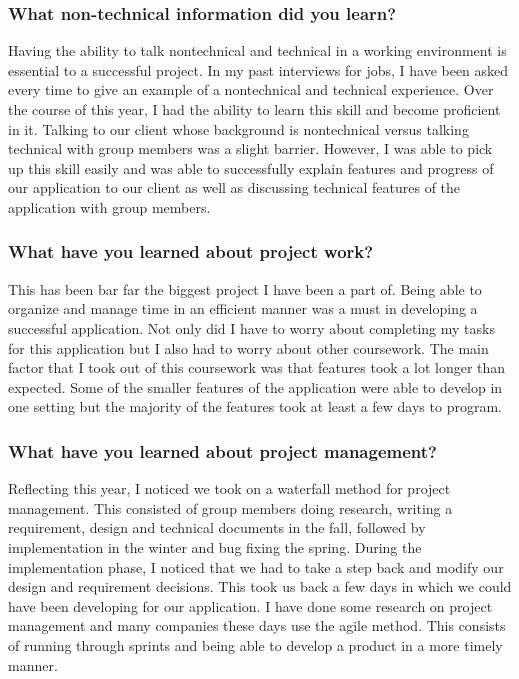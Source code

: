 \documentclass[onecolumn, draftclsnofoot,10pt, compsoc]{IEEEtran}
\begin{document}
    \subsubsection{What non-technical information did you learn?}
      Having the ability to talk nontechnical and technical in a working environment is essential to a successful project. In my past interviews for jobs, I have been asked every time to give an example of a nontechnical and technical experience. Over the course of this year, I had the ability to learn this skill and become proficient in it. Talking to our client whose background is nontechnical versus talking technical with group members was a slight barrier. However, I was able to pick up this skill easily and was able to successfully explain features and progress of our application to our client as well as discussing technical features of the application with group members.

    \subsubsection{What have you learned about project work?}
      This has been bar far the biggest project I have been a part of. Being able to organize and manage time in an efficient manner was a must in developing a successful application. Not only did I have to worry about completing my tasks for this application but I also had to worry about other coursework. The main factor that I took out of this coursework was that features took a lot longer than expected. Some of the smaller features of the application were able to develop in one setting but the majority of the features took at least a few days to program.

    \subsubsection{What have you learned about project management?}
      Reflecting this year, I noticed we took on a waterfall method for project management. This consisted of group members doing research, writing a requirement, design and technical documents in the fall, followed by implementation in the winter and bug fixing the spring. During the implementation phase, I noticed that we had to take a step back and modify our design and requirement decisions. This took us back a few days in which we could have been developing for our application. I have done some research on project management and many companies these days use the agile method. This consists of running through sprints and being able to develop a product in a more timely manner.
\end{document}
